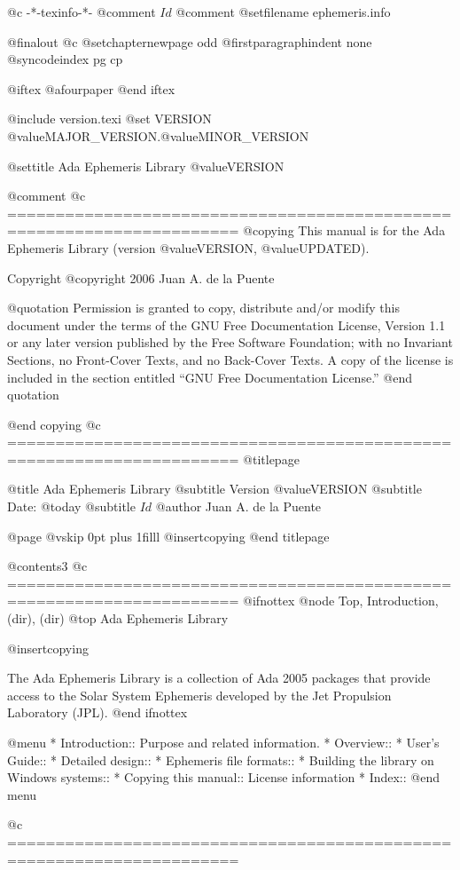    @c -*-texinfo-*-
@comment $Id$
@comment %
@setfilename ephemeris.info

@finalout
@c @setchapternewpage odd
@firstparagraphindent none
@syncodeindex pg cp

@iftex
@afourpaper
@end iftex

@include version.texi
@set VERSION @value{MAJOR_VERSION}.@value{MINOR_VERSION}

@settitle Ada Ephemeris Library @value{VERSION}

@comment %
@c ======================================================================
@copying
This manual is for the Ada Ephemeris Library (version @value{VERSION},
@value{UPDATED}).

Copyright @copyright{} 2006 Juan A. de la Puente

@quotation
Permission is granted to copy, distribute and/or modify this document
under the terms of the GNU Free Documentation License, Version 1.1 or
any later version published by the Free Software Foundation; with no
Invariant Sections, no Front-Cover Texts, and no Back-Cover Texts.  A
copy of the license is included in the section entitled ``GNU Free
Documentation License.''
@end quotation

@end copying
@c ======================================================================
@titlepage

@title Ada Ephemeris Library
@subtitle Version @value{VERSION}
@subtitle Date: @today{}
@subtitle $Id$
@author Juan A. de la Puente

@page
@vskip 0pt plus 1filll
@insertcopying
@end titlepage

@contents3
@c ======================================================================
@ifnottex
@node Top, Introduction, (dir), (dir)
@top Ada Ephemeris Library

@insertcopying

The Ada Ephemeris Library is a collection of Ada 2005 packages that
provide access to the Solar System Ephemeris developed by the
Jet Propulsion Laboratory (JPL).
@end ifnottex

@menu
* Introduction::                Purpose and related information.
* Overview::                    
* User's Guide::                
* Detailed design::             
* Ephemeris file formats::      
* Building the library on Windows systems::  
* Copying this manual::         License information
* Index::                       
@end menu

@c ======================================================================

